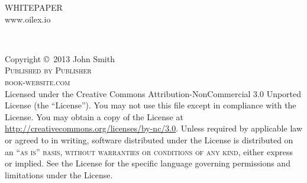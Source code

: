 \documentclass[11pt,fleqn]{book} %
\begin{document}

\begingroup
\thispagestyle{empty}
\vfill
\vfill
\begin{center}
	\color{darkgoldenrod} \LARGE WHITEPAPER \\
	\color{darkgoldenrod} \large www.oilex.io
\end{center}
\endgroup


\newpage
~\vfill
\thispagestyle{empty}

\noindent Copyright \copyright\ 2013 John Smith\\ %

\noindent \textsc{Published by Publisher}\\ %

\noindent \textsc{book-website.com}\\ %

\noindent Licensed under the Creative Commons Attribution-NonCommercial 3.0 Unported License (the ``License''). You may not use this file except in compliance with the License. You may obtain a copy of the License at \url{http://creativecommons.org/licenses/by-nc/3.0}. Unless required by applicable law or agreed to in writing, software distributed under the License is distributed on an \textsc{``as is'' basis, without warranties or conditions of any kind}, either express or implied. See the License for the specific language governing permissions and limitations under the License.\\ %
\end{document}
